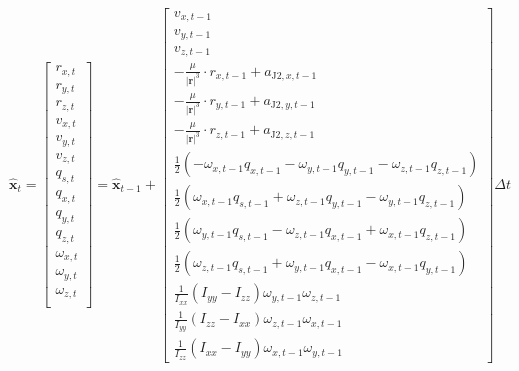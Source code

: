 \begin{equation}
    \mathbf{\hat{x}}_t
    =
    \begin{bmatrix}
        r_{x,t} \\
        r_{y,t} \\
        r_{z,t} \\
        v_{x,t} \\
        v_{y,t} \\
        v_{z,t} \\
        q_{s,t} \\
        q_{x,t} \\
        q_{y,t} \\
        q_{z,t} \\
        \omega_{x,t} \\
        \omega_{y,t} \\
        \omega_{z,t} \\
    \end{bmatrix}
    = \mathbf{\hat{x}}_{t-1} +
    \begin{bmatrix}
        v_{x,t-1} \\
        v_{y,t-1} \\
        v_{z,t-1} \\
        -\frac{\mu}{|\mathbf{r}|^3}\cdot r_{x,t-1} + a_{\text{J2},x,t-1} \\
        -\frac{\mu}{|\mathbf{r}|^3}\cdot r_{y,t-1} + a_{\text{J2},y,t-1} \\
        -\frac{\mu}{|\mathbf{r}|^3}\cdot r_{z,t-1} + a_{\text{J2},z,t-1} \\
        \frac{1}{2}(-\omega_{x,t-1}q_{x,t-1} - \omega_{y,t-1}q_{y,t-1} - \omega_{z,t-1}q_{z,t-1}) \\
        \frac{1}{2}( \omega_{x,t-1}q_{s,t-1} + \omega_{z,t-1}q_{y,t-1} - \omega_{y,t-1}q_{z,t-1}) \\
        \frac{1}{2}( \omega_{y,t-1}q_{s,t-1} - \omega_{z,t-1}q_{x,t-1} + \omega_{x,t-1}q_{z,t-1}) \\
        \frac{1}{2}( \omega_{z,t-1}q_{s,t-1} + \omega_{y,t-1}q_{x,t-1} - \omega_{x,t-1}q_{y,t-1}) \\
        \frac{1}{\mathit{I}_{xx}}(\mathit{I}_{yy}-\mathit{I}_{zz})\omega_{y,t-1}\omega_{z,t-1} \\
        \frac{1}{\mathit{I}_{yy}}(\mathit{I}_{zz}-\mathit{I}_{xx})\omega_{z,t-1}\omega_{x,t-1} \\
        \frac{1}{\mathit{I}_{zz}}(\mathit{I}_{xx}-\mathit{I}_{yy})\omega_{x,t-1}\omega_{y,t-1}
    \end{bmatrix}
    \Delta t
    \label{Eq:StateTransition}
\end{equation}

